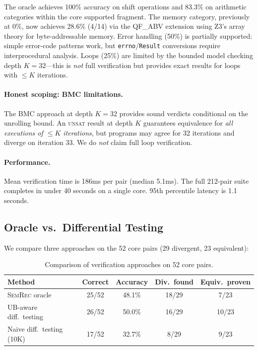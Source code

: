 \documentclass[11pt]{article}
\newcommand{\semrec}{\textsc{SemRec}}
\newcommand{\UNSAT}{\textsc{unsat}}
\begin{document}
The oracle achieves 100\% accuracy on shift operations and 83.3\% on
arithmetic categories within the core supported fragment.  The memory
category, previously at 0\%, now achieves 28.6\% (4/14) via the QF\_ABV
extension using Z3's array theory for byte-addressable memory.  Error
handling (50\%) is partially supported: simple error-code patterns work,
but \texttt{errno}/\texttt{Result} conversions require interprocedural
analysis.  Loops (25\%) are limited by the bounded model checking depth
$K=32$---this is \emph{not} full verification but provides exact results
for loops with $\leq K$ iterations.

\paragraph{Honest scoping: BMC limitations.}
The BMC approach at depth $K{=}32$ provides sound verdicts conditional on
the unrolling bound.  An \UNSAT{} result at depth $K$ guarantees equivalence
for \emph{all executions of $\leq K$ iterations}, but programs may agree
for 32 iterations and diverge on iteration 33.  We do \emph{not} claim
full loop verification.

\paragraph{Performance.}
Mean verification time is 186ms per pair (median 5.1ms).
The full 212-pair suite completes in under 40 seconds on a single core.
95th percentile latency is 1.1 seconds.

\subsection{Oracle vs.\ Differential Testing}\label{sec:eval:difftest}

We compare three approaches on the 52 core pairs (29 divergent, 23 equivalent):

\begin{table}[t]
\centering
\caption{Comparison of verification approaches on 52 core pairs.}\label{tab:difftest}
\begin{tabular}{@{}lcccc@{}}
\toprule
\textbf{Method} & \textbf{Correct} & \textbf{Accuracy} &
\textbf{Div.\ found} & \textbf{Equiv.\ proven} \\
\midrule
\semrec{} oracle            & 25/52 & 48.1\% & 18/29 & 7/23 \\
UB-aware diff.\ testing     & 26/52 & 50.0\% & 16/29 & 10/23 \\
Naive diff.\ testing (10K)  & 17/52 & 32.7\% &  8/29 &  9/23 \\
\bottomrule
\end{tabular}
\end{table}
\end{document}
